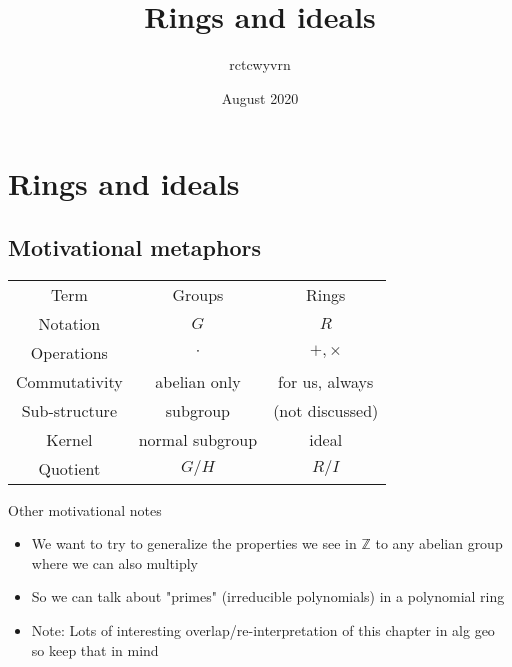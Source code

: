 \documentclass{article}
\title{Rings and ideals}
\author{rctcwyvrn }
\date{August 2020}
\newcommand{\Z}{\mathbb{Z}}
\begin{document}
\maketitle


\section{Rings and ideals}
\subsection{Motivational metaphors}
\begin{center}
	\begin{tabular}{c c c}
		Term & Groups & Rings \\
		Notation & $G$ & $R$ \\
		Operations & $\cdot$ & $+, \times$ \\
		Commutativity & abelian only & for us, always \\ 
		Sub-structure & subgroup & (not discussed) \\
		Kernel & normal subgroup & ideal \\
		Quotient & $G /H$ & $R /I$ \\
	\end{tabular}
\end{center}
Other motivational notes
\begin{itemize}
	\item We want to try to generalize the properties we see in $\Z$ to any abelian group where we can also multiply
	\item So we can talk about "primes" (irreducible polynomials) in a polynomial ring
	\item Note: Lots of interesting overlap/re-interpretation of this chapter in alg geo so keep that in mind
\end{itemize}
\end{document}
